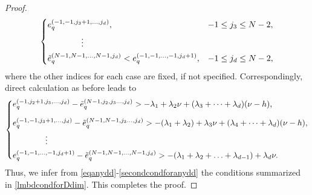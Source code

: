 \documentclass[10pt,reqno,final]{amsart}
\theoremstyle{remark}
\theoremstyle{definition}
\begin{document}
\begin{proof}
\begin{equation*}
\begin{dcases}
 e_q^{(-1,-1,j_3+1,\ldots,j_d)}, & -1\le j_3\le  N-2,  \\
\qquad \qquad \vdots\\
\tilde e_q^{(N-1,N-1,\ldots,N-1,j_d)}<
 e_q^{(-1,-1,\ldots,-1,j_d+1)}, & -1\le j_d\le  N-2,\end{dcases}
\end{equation*}
where the other indices for each case are fixed, if not specified. Correspondingly,  direct calculation as before leads to 
\begin{equation}\label{secondcondforanydd}
\begin{dcases}
 e_q^{(-1,j_2+1,j_3,\ldots,j_d)}-\tilde e_q^{(N-1,j_2,j_3\ldots,j_d)}
>-\lambda_1+\lambda_2\nu+(\lambda_3+\cdots+\lambda_d)(\nu-h),
  \\[6pt]
e_q^{(-1,-1,j_3+1,\ldots,j_d)}-\tilde e_q^{(N-1,N-1,j_3\ldots,j_d)}>-(\lambda_1+\lambda_2)+\lambda_3\nu+(\lambda_4+\cdots+\lambda_d)(\nu-h), \\
\qquad \qquad \vdots\\
e_q^{(-1,-1,\ldots,-1,j_d+1)}-\tilde e_q^{(N-1,N-1,\ldots,N-1,j_d)}>-(\lambda_1+\lambda_2+\ldots+\lambda_{d-1})+\lambda_d\nu.
\end{dcases}
\end{equation}
Thus, we infer from 
\eqref{eqanydd}-\eqref{secondcondforanydd} the conditions summarized in \eqref{lmbdcondforDdim}. This completes the proof.
\end{proof}


\end{document}
